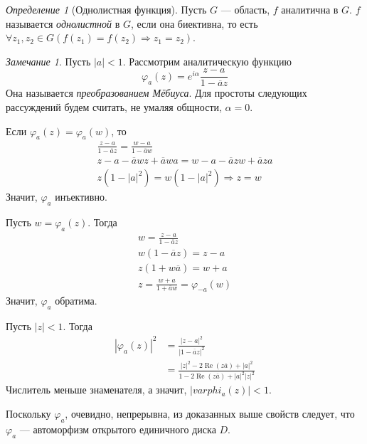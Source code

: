 \documentclass[12pt]{article}
\renewcommand{\Re}{\operatorname{Re}}
\newcommand{\Ra}{\Rightarrow}
\newcounter{cnt}
\theoremstyle{thmnote}
\theoremstyle{remark}
\newtheorem*{remark}{Замечание}
\theoremstyle{defnote}
\newtheorem{definition}[cnt]{Определение}
\begin{document}
\begin{definition}[Однолистная функция]
    Пусть $G$ --- область, $f$ аналитична в $G$. $f$ называется \textit{однолистной} в $G$, если она биективна, то есть $\forall z_1, z_2 \in G (f(z_1) = f(z_2) \Ra z_1 = z_2)$.
\end{definition}

\begin{remark}
    Пусть $|a| < 1$. Рассмотрим аналитическую функцию
    \begin{equation*}
        \varphi_a(z) = e^{i \alpha} \frac{z - a}{1 - \overline{a} z}
    \end{equation*}
    Она называется \textit{преобразованием Мёбиуса}. Для простоты следующих рассуждений будем считать, не умаляя общности, $\alpha = 0$.

    Если $\varphi_a(z) = \varphi_a(w)$, то
    \begin{gather*}
        \frac{z - a}{1 - \overline{a} z} = \frac{w - a}{1 - \overline{a} w} \\
        z - a - \overline{a} w z + \overline{a} w a = w - a - \overline{a} z w + \overline{a} z a \\
        z (1 - |a|^2) = w (1 - |a|^2) \Ra z = w
    \end{gather*}
    Значит, $\varphi_a$ инъективно.

    Пусть $w = \varphi_a(z)$. Тогда
    \begin{gather*}
        w = \frac{z - a}{1 - \overline{a} z} \\
        w (1 - \overline{a} z) = z - a \\
        z (1 + w \overline{a}) = w + a \\
        z = \frac{w + a}{1 + \overline{a} w} = \varphi_{-a}(w)
    \end{gather*}
    Значит, $\varphi_a$ обратима.

    Пусть $|z| < 1$. Тогда
    \begin{align*}
        \left| \varphi_a(z) \right|^2 &= \frac{|z - a|^2}{|1 - \overline{a} z|^2} \\
        &= \frac{|z|^2 - 2 \Re(z \overline{a}) + |a|^2}{1 - 2 \Re(z \overline{a}) + |a|^2 |z|^2}
    \end{align*}
    Числитель меньше знаменателя, а значит, $|varphi_a(z)| < 1$.

    Поскольку $\varphi_a$, очевидно, непрерывна, из доказанных выше свойств следует, что $\varphi_a$ --- автоморфизм открытого единичного диска $D$.
\end{remark}
\end{document}
